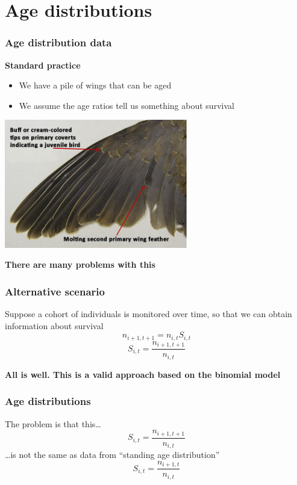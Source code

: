 \documentclass[color=usenames,dvipsnames]{beamer}\usepackage[]{graphicx}\usepackage[]{color}
\begin{document}
\section{Age distributions}



\begin{frame}
  \frametitle{Age distribution data}
  {\bf Standard practice}
  \begin{itemize}
    \item We have a pile of wings that can be aged \\
    \item We assume the age ratios tell us something about survival
  \end{itemize}
  \begin{center}
    \includegraphics[width=0.6\textwidth]{figs/dove_wing}
  \end{center}
  \pause
  {\centering \alert{\bf There are many problems with this} \par}
\end{frame}





\begin{frame}
  \frametitle{Alternative scenario}
  \large
  Suppose a cohort of individuals is monitored over time, so that we
  can obtain information about survival
  \Large
\[
  n_{i+1,t+1} = n_{i,t}S_{i,t}
\]
\pause
\[
  S_{i,t} = \frac{n_{i+1,t+1}}{n_{i,t}}
\]
\large
\pause
\vfill
{\centering \bf All is well. This is a valid approach based on the
  binomial model \par}
\end{frame}



\begin{frame}
  \frametitle{Age distributions}
  \large
  The problem is that this\dots
  \Large
\[
  S_{i,t} = \frac{n_{i+1,t+1}}{n_{i,t}}
\]
  \pause
  \large
  \dots is not the same as data from ``standing age distribution''
  \Large
\[
  S_{i,t} = \frac{n_{i+1,t}}{n_{i,t}}
\]
\end{frame}
\end{document}
